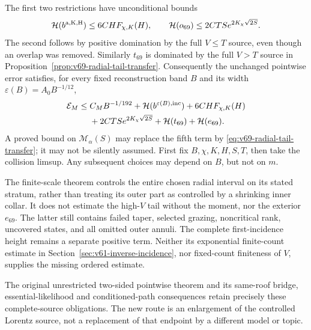 The first two restrictions have unconditional bounds
\[
 \mathcal H(b^{\rm a,K,H})\le6CH F_{\chi,K}(H),\qquad
 \mathcal H(o_{69})\le2CTS e^{2K_\chi\sqrt{2S}}.
\]
The second follows by positive domination by the full $V\le T$
source, even though an overlap was removed. Similarly $t_{69}$ is
dominated by the full $V>T$ source in
Proposition~\ref{prop:v69-radial-tail-transfer}. Consequently the
unchanged pointwise error satisfies, for every fixed reconstruction
band $B$ and its width $\varepsilon(B)=A_0B^{-1/12}$,
\begin{align}
 \mathcal E_M\le{}& C_MB^{-1/192}
       +\mathcal H(b^{\varepsilon(B),\mathrm{inc}})
       +6CH F_{\chi,K}(H)\notag\\
       &+2CTS e^{2K_\chi\sqrt{2S}}
         +\mathcal H(t_{69})+\mathcal H(e_{69}).
                                      \label{eq:v69-canonical-endpoint-budget}
\end{align}
A proved bound on $\mathcal M_\alpha(S)$ may replace the fifth
term by \eqref{eq:v69-radial-tail-transfer}; it may not be silently
assumed. First fix $B,\chi,K,H,S,T$, then take the collision limsup.
Any subsequent choices may depend on $B$, but not on $m$.

The finite-scale theorem controls the entire chosen radial interval
on its stated stratum, rather than treating its outer part as
controlled by a shrinking inner collar. It does not estimate the
high-$V$ tail without the moment, nor the exterior $e_{69}$.
The latter still contains failed taper, selected grazing, noncritical
rank, uncovered states, and all omitted outer annuli. The complete
first-incidence height remains a separate positive term. Neither
its exponential finite-count estimate in
Section~\ref{sec:v61-inverse-incidence}, nor fixed-count finiteness
of $V$, supplies the missing ordered estimate.

The original unrestricted two-sided pointwise theorem and its
same-roof bridge, essential-likelihood and conditioned-path
consequences retain precisely these complete-source obligations.
The new route is an enlargement of the controlled Lorentz source,
not a replacement of that endpoint by a different model or topic.
\label{end:v69-new-mathematics}
